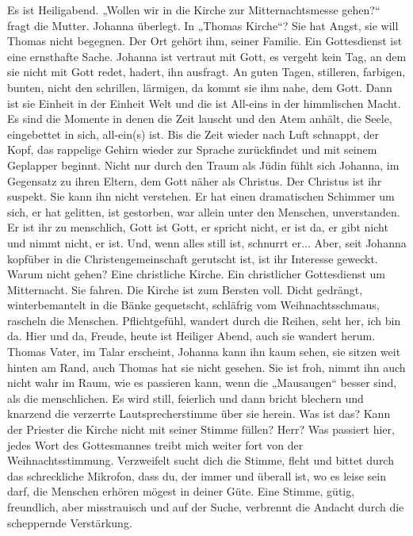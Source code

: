 Es ist Heiligabend. „Wollen wir in die Kirche zur Mitternachtsmesse gehen?“ fragt die Mutter. Johanna überlegt. In „Thomas Kirche“? Sie hat Angst, sie will Thomas nicht begegnen. Der Ort gehört ihm, seiner Familie. 
Ein Gottesdienst ist eine ernsthafte Sache. Johanna ist vertraut mit Gott, es vergeht kein Tag, an dem sie nicht mit Gott redet, hadert, ihn ausfragt. An guten Tagen, stilleren, farbigen, bunten, nicht den schrillen, lärmigen, da kommt sie ihm nahe, dem Gott. Dann ist sie Einheit in der Einheit Welt und die ist All-eins in der himmlischen Macht. Es sind die Momente in denen die Zeit lauscht und den Atem anhält, die Seele, eingebettet in sich, all-ein(s) ist. Bis die Zeit wieder nach Luft schnappt, der Kopf, das rappelige Gehirn wieder zur Sprache zurückfindet und mit seinem Geplapper beginnt.
Nicht nur durch den Traum als Jüdin fühlt sich Johanna, im Gegensatz zu ihren Eltern, dem Gott näher als Christus. Der Christus ist ihr suspekt. Sie kann ihn nicht verstehen. Er hat einen dramatischen Schimmer um sich, er hat gelitten, ist gestorben, war allein unter den Menschen, unverstanden. Er ist ihr zu menschlich, Gott ist Gott, er spricht nicht, er ist da, er gibt nicht und nimmt nicht, er ist. Und, wenn alles still ist, schnurrt er...
Aber, seit Johanna kopfüber in die Christengemeinschaft gerutscht ist, ist ihr Interesse geweckt. Warum nicht gehen? Eine christliche Kirche. Ein christlicher Gottesdienst um Mitternacht.
Sie fahren.
Die Kirche ist zum Bersten voll. Dicht gedrängt, winterbemantelt in die Bänke gequetscht, schläfrig vom Weihnachtsschmaus, rascheln die Menschen. Pflichtgefühl, wandert durch die Reihen, seht her, ich bin da. Hier und da, Freude, heute ist Heiliger Abend, auch sie wandert herum.
Thomas Vater, im Talar  erscheint, Johanna kann ihn kaum sehen, sie sitzen weit hinten am Rand, auch Thomas hat sie nicht gesehen. Sie ist froh, nimmt ihn auch nicht wahr im Raum, wie es passieren kann, wenn die „Mausaugen“ besser sind, als die menschlichen.
Es wird still, feierlich und dann bricht blechern und knarzend die verzerrte Lautsprecherstimme über sie herein. Was ist das? Kann der Priester die Kirche nicht mit seiner Stimme füllen? 
Herr? Was passiert hier, jedes Wort des Gottesmannes treibt mich weiter fort von der Weihnachtsstimmung. Verzweifelt sucht dich die Stimme, fleht und bittet durch das schreckliche Mikrofon, dass du, der immer und überall  ist, wo es leise sein darf, die Menschen erhören mögest in deiner Güte. Eine Stimme, gütig, freundlich, aber misstrauisch und auf der Suche, verbrennt die Andacht durch die scheppernde Verstärkung.
